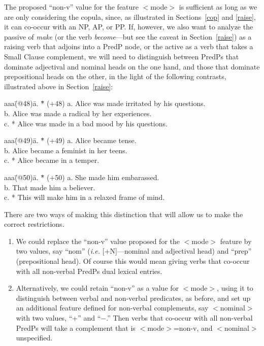 The proposed ``non-v'' value for the feature $<$mode$>$ is sufficient as
long as we are only considering the copula, since, as illustrated in
Sections~\ref{cop} and \ref{raise}, it can co-occur with an NP, AP, or
PP. If, however, we also want to analyze the passive of {\em make} (or
the verb {\em become\/}---but see the caveat in Section~\ref{raise})
as a raising verb that adjoins into a PredP node, or the active as a
verb that takes a Small Clause complement, we will need to distinguish
between PredPs that dominate adjectival and nominal heads on the one
hand, and those that dominate prepositional heads on the other, in the
light of the following contrasts, illustrated above in
Section~\ref{raise}:
\begin{tabbing}
aaa\=(@48)\= a. \= *\= \kill
   \>(+48)\> a. \>  \> Alice was made irritated by his questions.    \\
   \>     \> b. \>  \> Alice was made a radical by her experiences. \\
   \>     \> c. \> *\> Alice was made in a bad mood by his questions.
\end{tabbing}
\begin{tabbing}
aaa\=(@49)\= a. \= *\= \kill
   \>(+49)\> a. \>  \> Alice became tense.      \\
   \>     \> b. \>  \> Alice became a feminist in her teens. \\
   \>     \> c. \> *\> Alice became in a temper. 
\end{tabbing}
\begin{tabbing}
aaa\=(@50)\= a. \= *\= \kill
   \>(+50)\> a. \>  \> She made him embarassed.      \\
   \>     \> b. \>  \> That made him a believer. \\
   \>     \> c. \> *\> This will make him in a relaxed frame of mind. 
\end{tabbing}

There are two ways of making this distinction that will allow us to make
the correct restrictions.
\begin{enumerate}

\item We could replace the ``non-v'' value proposed for the 
$<$mode$>$ feature by two values, say ``nom'' ({\em i.e.\/} [+N]---nominal and
adjectival head) and ``prep'' (prepositional head).  Of course this
would mean giving verbs that co-occur with all non-verbal PredPs dual
lexical entries.  

\item Alternatively, we could retain ``non-v'' as a value
for $<$mode$>$, using it to distinguish between verbal and non-verbal
predicates, as before, and set up an additional feature defined for
non-verbal complements, say $<$nominal$>$ with two values, ``+'' and
``$-$.'' Then verbs that co-occur with all non-verbal PredPs will take a
complement that is $<$mode$>$=non-v, and $<$nominal$>$ unspecified.

\end{enumerate} 

